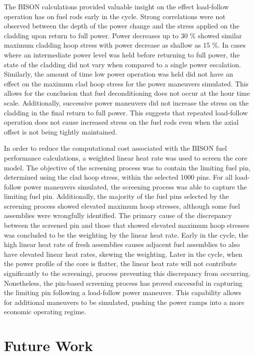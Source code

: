 \documentclass[edeposit,fullpage,11pt]{uiucthesis2009}
\begin{document}
The BISON calculations provided valuable insight on the effect load-follow operation has on fuel rods early in the cycle.
Strong correlations were not observed between the depth of the power change and the stress applied on the cladding upon return to full power.
Power decreases up to 30 \% showed similar maximum cladding hoop stress with power decrease as shallow as 15 \%.
In cases where an intermediate power level was held before returning to full power, the state of the cladding did not vary when compared to a single power escalation.
Similarly, the amount of time low power operation was held did not have an effect on the maximum clad hoop stress for the power maneuvers simulated.
This allows for the conclusion that fuel deconditioning does not occur at the hour time scale.
Additionally, successive power maneuvers did not increase the stress on the cladding in the final return to full power.
This suggests that repeated load-follow operation does not cause increased stress on the fuel rods even when the axial offset is not being tightly maintained.

In order to reduce the computational cost associated with the BISON fuel performance calculations, a weighted linear heat rate was used to screen the core model.
The objective of the screening process was to contain the limiting fuel pin, determined using the clad hoop stress, within the selected 1000 pins.
For all load-follow power maneuvers simulated, the screening process was able to capture the limiting fuel pin.
Additionally, the majority of the fuel pins selected by the screening process showed elevated maximum hoop stresses, although some fuel assemblies were wrongfully identified.
The primary cause of the discrepancy between the screened pin and those that showed elevated maximum hoop stresses was concluded to be the weighting by the linear heat rate.
Early in the cycle, the high linear heat rate of fresh assemblies causes adjacent fuel assemblies to also have elevated linear heat rates, skewing the weighting. 
Later in the cycle, when the power profile of the core is flatter, the linear heat rate will not contribute significantly to the screeningi, process preventing this discrepancy from occurring. 
Nonetheless, the pin-based screening process has proved successful in capturing the limiting pin following a load-follow power maneuver. 
This capability allows for additional maneuvers to be simulated, pushing the power ramps into a more economic operating regime.

\section{Future Work}
\end{document}
